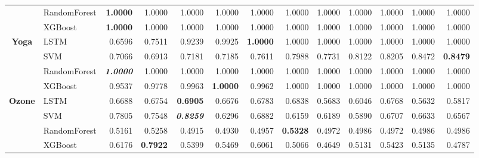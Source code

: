 \begin{table}[H]
\begin{adjustbox}{max width=14cm}
\begin{tabular}{|c|l|r|r|r|r|r|r|r|r|r|r|r|}
			                      & RandomForest & \textbf{1.0000}                   & 1.0000 & 1.0000          & 1.0000 & 1.0000          & 1.0000 & 1.0000          & 1.0000                   & 1.0000                   & 1.0000          & 1.0000 \\
			                      & XGBoost      & \textbf{1.0000}                   & 1.0000 & 1.0000          & 1.0000 & 1.0000          & 1.0000 & 1.0000          & 1.0000                   & 1.0000                   & 1.0000          & 1.0000 \\
			\hline
			\textbf{Yoga}         & LSTM         & 0.6596                   & 0.7511 & 0.9239          & 0.9925 & \textbf{1.0000} & 1.0000 & 1.0000          & 1.0000                   & 1.0000                   & 1.0000          & 1.0000 \\
			                      & SVM          & 0.7066                   & 0.6913 & 0.7181          & 0.7185 & 0.7611          & 0.7988 & 0.7731          & 0.8122                   & 0.8205                   & 0.8472          & \textbf{0.8479} \\
			                      & RandomForest & \textit{\textbf{1.0000}}          & 1.0000 & 1.0000          & 1.0000 & 1.0000          & 1.0000 & 1.0000          & 1.0000                   & 1.0000                   & 1.0000          & 1.0000 \\
			                      & XGBoost      & 0.9537                   & 0.9778 & 0.9963          & \textbf{1.0000} & 0.9962          & 1.0000 & 1.0000          & 1.0000                   & 1.0000                   & 1.0000          & 1.0000 \\
			\hline
			\textbf{Ozone}        & LSTM         & 0.6688                   & 0.6754 & \textbf{0.6905}          & 0.6676 & 0.6783          & 0.6838 & 0.5683          & 0.6046                   & 0.6768                   & 0.5632          & 0.5817 \\
			                      & SVM          & 0.7805                   & 0.7548 & \textit{\textbf{0.8259}} & 0.6296 & 0.6882          & 0.6159 & 0.6189          & 0.5890                   & 0.6707                   & 0.6633          & 0.6567 \\
			                      & RandomForest & 0.5161                   & 0.5258 & 0.4915          & 0.4930 & 0.4957          & \textbf{0.5328} & 0.4972          & 0.4986                   & 0.4972                   & 0.4986          & 0.4986 \\
			                      & XGBoost      & 0.6176                   & \textbf{0.7922} & 0.5399          & 0.5469 & 0.6061          & 0.5066 & 0.4649          & 0.5131                   & 0.5423                   & 0.5135          & 0.4787 \\

\end{tabular}
\end{adjustbox}
\end{table}
